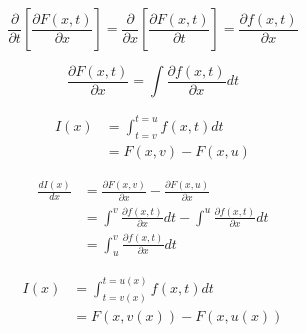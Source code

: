 \begin{equation*}
    \frac{\partial}{\partial t}\left[\frac{\partial F(x,t)}{\partial x}\right] =
    \frac{\partial}{\partial x}\left[\frac{\partial F(x,t)}{\partial t}\right] =
    \frac{\partial f(x,t)}{\partial x}
\end{equation*}

\begin{equation*}
    \frac{\partial F(x,t)}{\partial x} = \int \frac{\partial f(x,t)}{\partial x} dt
\end{equation*}

\begin{align*}
    I(x) &= \int_{t=v}^{t=u}f(x,t)dt\\
    &= F(x,v) - F(x,u)
\end{align*}

\begin{align*}
    \frac{dI(x)}{dx} &= \frac{\partial F(x,v)}{\partial x} - \frac{\partial F(x,u)}{\partial x}\\
    &= \int^{v} \frac{\partial f(x,t)}{\partial x}dt - \int^{u} \frac{\partial f(x,t)}{\partial x}dt\\
    &= \int_{u}^{v} \frac{\partial f(x,t)}{\partial x}dt
\end{align*}

\begin{align*}
    I(x) &= \int_{t=v(x)}^{t=u(x)}f(x,t)dt\\
    &= F(x,v(x)) - F(x,u(x))
\end{align*}